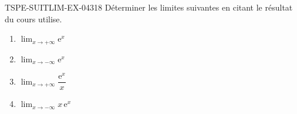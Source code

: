 \begin{exercice}{TSPE-SUITLIM-EX-043}{1}{8}
Déterminer les limites suivantes en citant le résultat du cours utilise.
\begin{enumerate}
  \item $\lim_{x \to +\infty} \mathrm{e}^x$
  \item $\lim_{x \to -\infty} \mathrm{e}^x$
  \item $\lim_{x \to +\infty} \dfrac{\mathrm{e}^x}{x}$
  \item $\lim_{x \to -\infty} x\,\mathrm{e}^x$
\end{enumerate}
\end{exercice}
